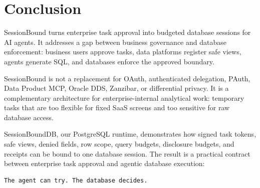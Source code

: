 \documentclass[journal]{IEEEtran}
\begin{document}
\hypertarget{conclusion}{%
\section{Conclusion}\label{conclusion}}

SessionBound turns enterprise task approval into budgeted database
sessions for AI agents. It addresses a gap between business governance
and database enforcement: business users approve tasks, data platforms
register safe views, agents generate SQL, and databases enforce the
approved boundary.

SessionBound is not a replacement for OAuth, authenticated delegation,
PAuth, Data Product MCP, Oracle DDS, Zanzibar, or differential privacy.
It is a complementary architecture for enterprise-internal analytical
work: temporary tasks that are too flexible for fixed SaaS screens and
too sensitive for raw database access.

SessionBoundDB, our PostgreSQL runtime, demonstrates how signed task
tokens, safe views, denied fields, row scope, query budgets, disclosure
budgets, and receipts can be bound to one database session. The result
is a practical contract between enterprise task approval and agentic
database execution:

\begin{verbatim}
The agent can try. The database decides.
\end{verbatim}



\end{document}
